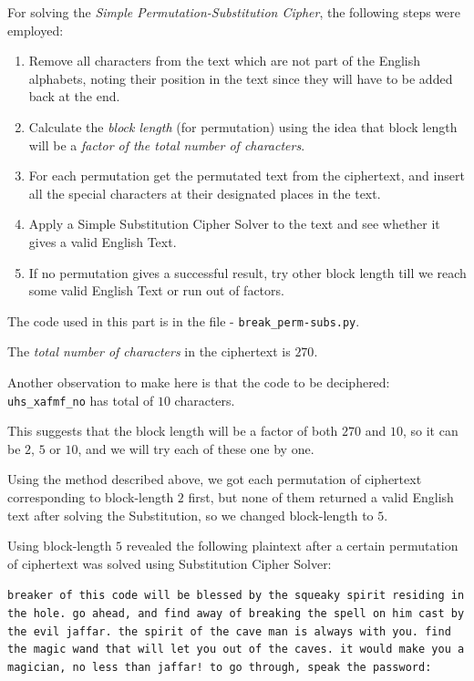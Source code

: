 \documentclass[10pt,twoside]{article}
\begin{document}
For solving the \textit{Simple Permutation-Substitution Cipher}, the following steps were employed:
\begin{enumerate}
  \setlength\itemsep{0em}
    \item Remove all characters from the text which are not part of the English alphabets, noting their position in the text since they will have to be added back at the end.
    \item Calculate the \textit{block length} (for permutation) using the idea that block length will be a \textit{factor of the total number of characters}.
    \item For each permutation get the permutated text from the ciphertext, and insert all the special characters at their designated places in the text.
    \item Apply a Simple Substitution Cipher Solver to the text and see whether it gives a valid English Text.
    \item If no permutation gives a successful result, try other block length till we reach some valid English Text or run out of factors.
\end{enumerate}

The code used in this part is in the file - \texttt{break\_perm-subs.py}. \newline

The \textit{total number of characters} in the ciphertext is $270$.

Another observation to make here is that the code to be deciphered: \texttt{uhs\_xafmf\_no} has total of $10$ characters.

This suggests that the block length will be a factor of both $270$ and $10$, so it can be $2$, $5$ or $10$, and we will try each of these one by one. \newline

Using the method described above, we got each permutation of ciphertext corresponding to block-length $2$ first, but none of them returned a valid English text after solving the Substitution, so we changed block-length to $5$. \newline

Using block-length $5$ revealed the following plaintext after a certain permutation of ciphertext was solved using Substitution Cipher Solver: \newline

\texttt{breaker of this code will be blessed by the squeaky spirit residing in the hole. go ahead, and find away of breaking the spell on him cast by the evil jaffar. the spirit of the cave man is always with you. find the magic wand that will let you out of the caves. it would make you a magician, no less than jaffar! to go through, speak the password:} \newline
\end{document}
